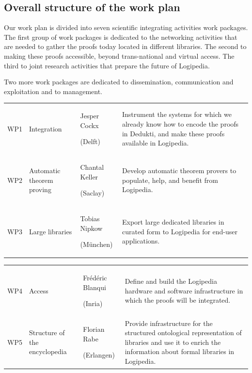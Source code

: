 \subsection*{Overall structure of the work plan}

Our work plan is divided into seven scientific integrating activities
work packages.  The first group of work packages is dedicated to the
networking activities that are needed to gather the proofs today
located in different libraries.  The second to making these proofs
accessible, beyond trans-national and virtual access.  The third to
joint research activities that prepare the future of Logipedia.

Two more work packages are dedicated to dissemination, communication
and exploitation and to management.

\begin{longtable*}{|p{0.05\textwidth}|p{0.15\textwidth}|p{0.17\textwidth}|p{0.55\textwidth}|}
\hline
{}\\
\hline
WP1
&
Integration &
Jesper Cockx

(Delft)
&
Instrument the systems for which we already know how to encode the
proofs in Dedukti, and make these proofs available in Logipedia.
\\
\hline
WP2
&
Automatic theorem proving
&
Chantal Keller

(Saclay)
& 
Develop automatic theorem provers to populate,
help, and benefit from Logipedia.
\\
\hline
WP3
&
Large libraries
&
Tobias Nipkow

(M\"unchen)
&
Export large dedicated libraries in curated form 
to Logipedia for end-user applications.
\\
\hline
\end{longtable*}

\begin{longtable*}{|p{0.05\textwidth}|p{0.15\textwidth}|p{0.17\textwidth}|p{0.55\textwidth}|}
\hline
{}\\
\hline
WP4
&
Access
&
Frédéric Blanqui

(Inria)
&
Define and build the Logipedia hardware and software infrastructure in
which the proofs will be integrated.
\\
\hline
WP5
&
Structure of the encyclopedia
&
Florian Rabe

(Erlangen)
&
Provide infrastructure for the structured ontological representation
of libraries and use it to enrich the information about formal
libraries in Logipedia.
\\
\hline
\end{longtable*}


